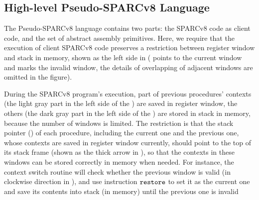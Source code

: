 \subsection{High-level Pseudo-SPARCv8 Language}
\label{subsec:High-level Pseudo-SPARCv8 Language}

The Pseudo-SPARCv8 language contains two parts: 
the SPARCv8 code as client code, 
and the set of abstract assembly primitives. 
Here, we require that the execution of client SPARCv8 code 
preserves a restriction between register 
window and stack in memory, shown
as the left side in \Fig{\ref{fig:Abstraction of Register Windows and Memory}}
(\regcwp{} points to the current window and \regwim{} marks 
the invalid window, the details of overlapping 
of adjacent windows are omitted in the figure).
\begin{center}
    
    \vspace*{-0.5em}
    \label{fig:Abstraction of Register Windows and Memory}
    \vspace{-0.5em}
\end{center}
During the SPARCv8 program's execution, 
part of previous procedures' contexts 
(the light gray part in the left side of the 
\Fig{\ref{fig:Abstraction of Register Windows and Memory}}) 
are saved in register window, the others 
(the dark gray part in the left side of the 
\Fig{\ref{fig:Abstraction of Register Windows and Memory}})
are stored in stack in memory, 
because the number of windows is limited. 
The restriction is that the stack pointer 
(\spreg{}) of each procedure, 
including the current one and the previous one, 
whose contexts are saved in register 
window currently, should point to the top of its stack frame 
(shown as the thick arrow in 
\Fig{\ref{fig:Abstraction of Register Windows and Memory}}),
so that the contexts 
in these windows can be stored correctly 
in memory when needed. For instance,  
the context switch routine will check 
whether the previous window is valid 
(in clockwise direction in 
\Fig{\ref{fig:Abstraction of Register Windows and Memory}}), 
and use instruction $\texttt{restore}{}$ to set it as the 
current one and save its contents into stack 
(in memory) until the previous one is invalid 
